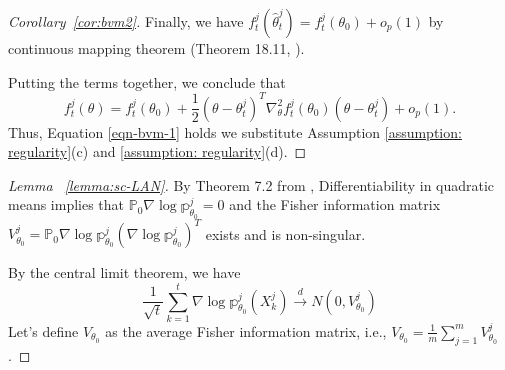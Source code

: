 \documentclass[twoside,11pt]{article}
\numberwithin{equation}{section}
\newcommand\bP{\mathbb{P}}
\newcommand\bp{\mathbb{p}}
\newcommand{\dto}{\stackrel{d}{\to}}
\begin{document}
{\begin{proof}[Corollary~\ref{cor:bvm2}]
Finally, we have $f_t^j(\hat \theta_t^j) = f_t^j(\theta_0) + o_p(1)$ by continuous mapping theorem (Theorem 18.11, \cite{VanderVaart2000}).  

Putting the terms together, we conclude that
\begin{equation*}
        f_t^j(\theta) = f_t^j(\theta_0) + \frac{1}{2} (\theta - \theta_t^j)^T \nabla_\theta^2 f_t^j(\theta_0) (\theta - \theta_t^j) + o_p(1). 
\end{equation*}
Thus, Equation \eqref{eqn-bvm-1} holds we substitute Assumption \ref{assumption: regularity}(c) and \ref{assumption: regularity}(d). 
\end{proof}
\begin{proof}[Lemma ~\ref{lemma:sc-LAN}]
By Theorem 7.2 from \cite{VanderVaart2000}, Differentiability in quadratic means implies that $\bP_0 \nabla \log \bp_{\theta_0}^j = 0$ and the Fisher information matrix $V_{\theta_0}^j = \bP_0 \nabla \log \bp_{\theta_0}^j (\nabla \log \bp_{\theta_0}^j)^T$ exists and is non-singular. 

By the central limit theorem, we have 
\begin{equation*}
    \frac{1}{\sqrt{t}} \sum_{k = 1}^t \nabla \log \bp_{\theta_0}^j(X_k^j) \dto N(0, V_{\theta_0}^j)
\end{equation*}
Let's define $V_{\theta_0}$ as the average Fisher information matrix, i.e., $V_{\theta_0} = \frac{1}{m} \sum_{j = 1}^m V_{\theta_0}^j$.


\end{proof}}
\end{document}

